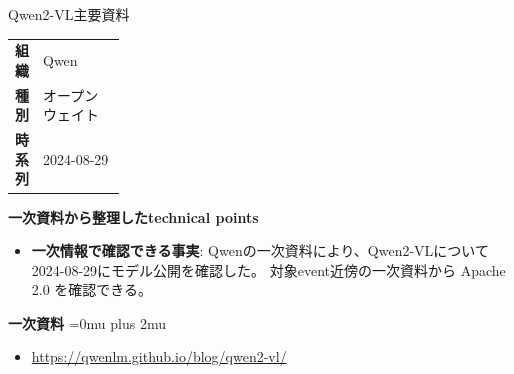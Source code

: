 \begin{technicalnote}{Qwen2-VL}{主要資料}
\begingroup
\begin{tabularx}{\linewidth}{@{}>{\bfseries}p{0.22\linewidth}X@{}}
組織 & Qwen \\
種別 & オープンウェイト \\
時系列 & 2024-08-29 \\
\end{tabularx}
\smallskip
{\bfseries 一次資料から整理したtechnical points}
\begin{itemize}[leftmargin=1.5em,itemsep=0.35em]
\item \textbf{一次情報で確認できる事実}: Qwenの一次資料により、Qwen2-VLについて2024-08-29にモデル公開を確認した。 対象event近傍の一次資料から Apache 2.0 を確認できる。
\end{itemize}
\begin{minipage}{\linewidth}
\begin{samepage}
{\bfseries 一次資料}
\begingroup\sloppy
\Urlmuskip=0mu plus 2mu\relax
\begin{itemize}[leftmargin=1.5em,itemsep=0.25em]
\item {\scriptsize\url{https://qwenlm.github.io/blog/qwen2-vl/}}
\end{itemize}
\endgroup
\end{samepage}
\end{minipage}
\endgroup
\end{technicalnote}
\medskip

